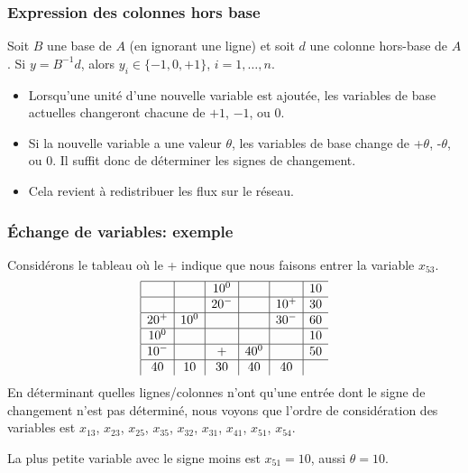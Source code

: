 \documentclass[usepdftitle=false, aspectratio=169]{beamer}
\begin{document}
\begin{frame}
\frametitle{Expression des colonnes hors base}

\begin{mltheorem}
Soit $B$ une base de $A$ (en ignorant une ligne) et soit $d$ une colonne hors-base de $A$.
Si $y = B^{-1}d$, alors $y_i \in \{ -1, 0, +1 \}$, $i = 1,\ldots,n$.
\end{mltheorem}

\begin{itemize}
	\item 
Lorsqu'une unité d'une nouvelle variable est ajoutée, les variables de base actuelles changeront chacune de $+1$, $-1$, ou $0$.
	\item 
Si la nouvelle variable a une valeur $\theta$, les variables de base
change de +$\theta$, -$\theta$, ou 0. Il suffit donc de déterminer les signes de
changement.
	\item 
Cela revient à redistribuer les flux sur le réseau.
\end{itemize}

\end{frame}

\begin{frame}
\frametitle{Échange de variables: exemple}

Considérons le tableau où le + indique que nous faisons entrer la variable $x_{53}$.
$$
	\begin{array}{|c|c|c|c|c|c}
		\hline
		& & 10^0 & & & 10 \\
		\hline
		& & 20^- & & 10^+ & 30 \\
		\hline
		20^+ & 10^0 & & & 30^- & 60 \\
		\hline
		10^0 & & & & & 10 \\
		\hline
        10^- & & + & 40^0 & & 50 \\
		\hline
		40 & 10 & 30 & 40 & 40 & \\
	\end{array}
$$
En déterminant quelles lignes/colonnes n'ont qu'une entrée dont le signe de changement n'est pas déterminé, nous voyons que l'ordre de considération des variables est $x_{13}$, $x_{23}$, $x_{25}$, $x_{35}$, $x_{32}$, $x_{31}$, $x_{41}$, $x_{51}$, $x_{54}$.

La plus petite variable avec le signe moins est $x_{51} = 10$, aussi $\theta = 10$.
\end{frame}
\end{document}

